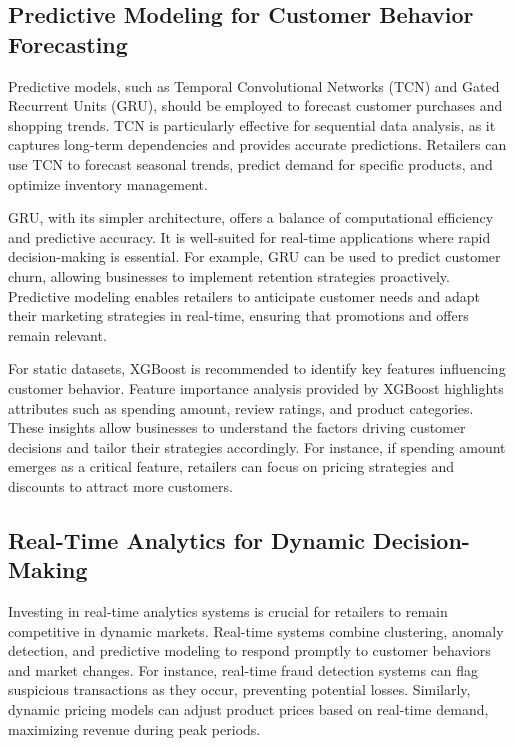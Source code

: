 \documentclass[12pt, a4paper,twoside]{report}
\theoremstyle{plain} %
\theoremstyle{definition} %
\theoremstyle{remark} %
\numberwithin{equation}{chapter}
\begin{document}
\subsection{Predictive Modeling for Customer Behavior Forecasting}

Predictive models, such as Temporal Convolutional Networks (TCN) and Gated Recurrent Units (GRU), should be employed to forecast customer purchases and shopping trends. TCN is particularly effective for sequential data analysis, as it captures long-term dependencies and provides accurate predictions. Retailers can use TCN to forecast seasonal trends, predict demand for specific products, and optimize inventory management.

GRU, with its simpler architecture, offers a balance of computational efficiency and predictive accuracy. It is well-suited for real-time applications where rapid decision-making is essential. For example, GRU can be used to predict customer churn, allowing businesses to implement retention strategies proactively. Predictive modeling enables retailers to anticipate customer needs and adapt their marketing strategies in real-time, ensuring that promotions and offers remain relevant.

For static datasets, XGBoost is recommended to identify key features influencing customer behavior. Feature importance analysis provided by XGBoost highlights attributes such as spending amount, review ratings, and product categories. These insights allow businesses to understand the factors driving customer decisions and tailor their strategies accordingly. For instance, if spending amount emerges as a critical feature, retailers can focus on pricing strategies and discounts to attract more customers.

\subsection{Real-Time Analytics for Dynamic Decision-Making}

Investing in real-time analytics systems is crucial for retailers to remain competitive in dynamic markets. Real-time systems combine clustering, anomaly detection, and predictive modeling to respond promptly to customer behaviors and market changes. For instance, real-time fraud detection systems can flag suspicious transactions as they occur, preventing potential losses. Similarly, dynamic pricing models can adjust product prices based on real-time demand, maximizing revenue during peak periods.
\end{document}
